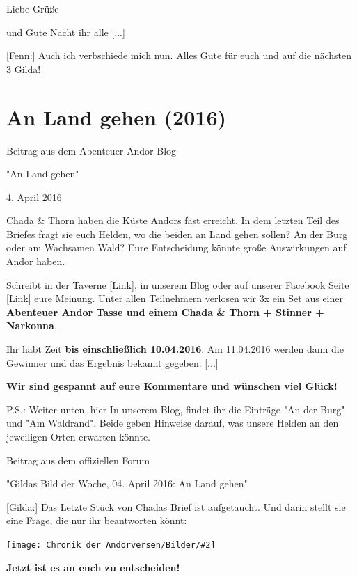 \documentclass[10pt, a4paper, oneside]{book}
\newcommand{\fillbreak}{\vspace*{\fill}\columnbreak}
\newcommand{\storytext}[1]{%
    \section{#1}%
    \label{Storytext: #1}%
}
\newcommand{\bildmitts}[2][height=0.32\textwidth,width=0.48\textwidth,keepaspectratio]{%
    \begin{center}
        \texttt{[image: Chronik der Andorversen/Bilder/\#2]}
    \end{center}
}
\begin{document}
\begin{multicols}{2}
Liebe Grüße

und Gute Nacht ihr alle [...]

[Fenn:] Auch ich verbschiede mich nun. Alles Gute für euch und auf die nächsten 3 Gilda!







\fillbreak
\storytext{An Land gehen (2016)}




\begin{center}
    Beitrag aus dem Abenteuer Andor Blog

    "An Land gehen"

    4. April 2016
\end{center}


Chada \& Thorn haben die Küste Andors fast erreicht. In dem letzten Teil des Briefes fragt sie euch Helden, wo die beiden an Land gehen sollen? An der Burg oder am Wachsamen Wald? Eure Entscheidung könnte große Auswirkungen auf Andor haben.

Schreibt in der Taverne [Link], in unserem Blog oder auf unserer Facebook Seite [Link] eure Meinung. Unter allen Teilnehmern verlosen wir 3x ein Set aus einer \textbf{Abenteuer Andor Tasse und einem Chada \& Thorn + Stinner + Narkonna}.

Ihr habt Zeit \textbf{bis einschließlich 10.04.2016}. Am 11.04.2016 werden dann die Gewinner und das Ergebnis bekannt gegeben. [...]

\textbf{Wir sind gespannt auf eure Kommentare und wünschen viel Glück!}

P.S.: Weiter unten, hier In unserem Blog, findet ihr die Einträge "An der Burg" und "Am Waldrand". Beide geben Hinweise darauf, was unsere Helden an den jeweiligen Orten erwarten könnte.


\begin{center}
    Beitrag aus dem offiziellen Forum

    "Gildas Bild der Woche, 04. April 2016: An Land gehen"
\end{center}



[Gilda:] Das Letzte Stück von Chadas Brief ist aufgetaucht. Und darin stellt sie eine Frage, die nur ihr beantworten könnt:

\bildmitts{AA2016 An Land gehen 1.jpeg}

\textbf{Jetzt ist es an euch zu entscheiden!}


\end{multicols}
\end{document}
